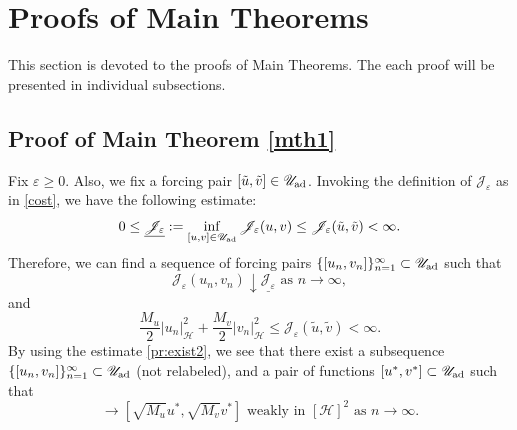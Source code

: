 \documentclass{sinst}
\numberwithin{equation}{section}
\theoremstyle{plain}
\theoremstyle{definition}
\def\sH{\mathscr{H}}
\def\sJ{\mathscr{J}}
\def\sU{\mathscr{U}}
\def\ad{{\rm ad}}
\begin{document}
\section{Proofs of Main Theorems}

This section is devoted to the proofs of Main Theorems. The each proof will be presented in individual subsections.

\subsection{Proof of Main Theorem \ref{mth1}} \label{proof1}
Fix $\varepsilon \geq 0$. Also, we fix a forcing pair $[\tilde u, \tilde v] \in \sU_\ad$. Invoking the definition of $\sJ_\varepsilon$ as in \eqref{cost}, we have the following estimate:
\begin{equation}
  0 \leq \underline{\sJ_\varepsilon} := \inf_{[u,v] \in \sU_\ad} \sJ_\varepsilon(u,v) \leq \sJ_\varepsilon(\tilde u, \tilde v) < \infty.
\end{equation}
Therefore, we can find a sequence of forcing pairs $\{ [u_n, v_n] \}_{n=1}^\infty \subset \sU_\ad$ such that
\begin{equation}
  \sJ_\varepsilon(u_n, v_n) \downarrow \underline{\sJ_\varepsilon} \mbox{ as } n \to \infty, \label{pr:exist1}
\end{equation}
and
\begin{equation}
  \frac{M_u}{2} |u_n|_{\sH}^2 + \frac{M_v}{2} |v_n|_\sH^2 \leq \sJ_\varepsilon(\tilde u, \tilde v) < \infty. \label{pr:exist2}
\end{equation}
By using the estimate \eqref{pr:exist2}, we see that there exist a subsequence $\{ [u_n, v_n] \}_{n=1}^\infty \subset \sU_\ad$ (not relabeled), and a pair of functions $[u^*, v^*] \subset \sU_\ad$ such that
\begin{equation}
  [\sqrt{M_u} u_n, \sqrt{M_v} v_n] \to [\sqrt{M_u} u^*, \sqrt{M_v} v^*] \mbox{ weakly in } [\sH]^2 \mbox{ as } n \to \infty. \label{pr:exist3}
\end{equation}
\end{document}
